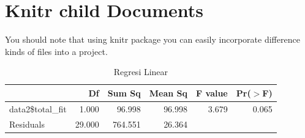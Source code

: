 \documentclass[12pt,oneside]{udthesis}\usepackage[]{graphicx}\usepackage[]{color}
\begin{document}
\newcommand{\tabRegresi}{
\begin{table}[ht]
\centering
\begin{tabular}{lrrrrr}
  \hline
 & Df & Sum Sq & Mean Sq & F value & Pr($>$F) \\ 
  \hline
data2\$total\_fit & 1.000 & 96.998 & 96.998 & 3.679 & 0.065 \\ 
  Residuals & 29.000 & 764.551 & 26.364 &  &  \\ 
   \hline
\end{tabular}
\caption{Regresi Linear} 
\label{tabRegresi}
\end{table}
}


\section{ Knitr child Documents}
You should note that using knitr package you can easily incorporate difference kinds of files into a project.

\tabRegresi
\pieChartFig


%










\end{document}
